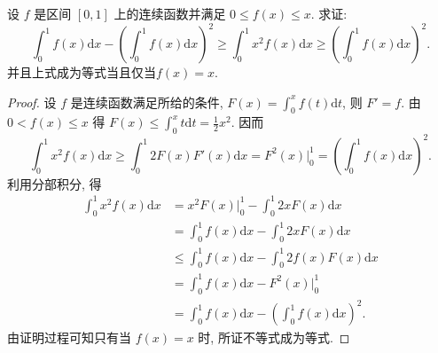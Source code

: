 \documentclass[../../main.tex]{subfiles}
\begin{document}
\begin{example}
设 $f$ 是区间 $[0,1]$ 上的连续函数并满足 $0\leqslant  f(x)\leqslant  x$. 求证:
$$\int_0^1 f(x)\mathrm{d}x-\left(\int_0^1 f(x)\mathrm{d}x\right)^2\geqslant \int_0^1 x^2f(x)\mathrm{d}x\geqslant \left(\int_0^1 f(x)\mathrm{d}x\right)^2.$$
并且上式成为等式当且仅当$f(x)=x$.
\end{example}
\begin{proof}
设 $f$ 是连续函数满足所给的条件, $F(x)=\int_0^x f(t)\mathrm{d}t$, 则 $F'=f$. 由 $0<f(x)\leqslant  x$ 得 $F(x)\leqslant \int_0^x t\mathrm{d}t=\frac{1}{2}x^2$. 因而
$$\int_0^1 x^2f(x)\mathrm{d}x\geqslant \int_0^1 2F(x)F'(x)\mathrm{d}x=F^2(x)\bigg|_0^1=\left(\int_0^1 f(x)\mathrm{d}x\right)^2.$$
利用分部积分, 得
$$
\begin{aligned}
\int_0^1 x^2f(x)\mathrm{d}x &= x^2F(x)\bigg|_0^1-\int_0^1 2xF(x)\mathrm{d}x \\
&= \int_0^1 f(x)\mathrm{d}x-\int_0^1 2xF(x)\mathrm{d}x \\
&\leqslant  \int_0^1 f(x)\mathrm{d}x-\int_0^1 2f(x)F(x)\mathrm{d}x \\
&= \int_0^1 f(x)\mathrm{d}x-F^2(x)\bigg|_0^1 \\
&= \int_0^1 f(x)\mathrm{d}x-\left(\int_0^1 f(x)\mathrm{d}x\right)^2.
\end{aligned}
$$
由证明过程可知只有当 $f(x)=x$ 时, 所证不等式成为等式.
\end{proof}
\end{document}

